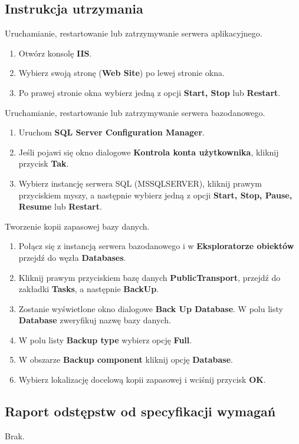 \documentclass[10pt,a4paper]{article}
\begin{document}
\subsection{Instrukcja utrzymania}
Uruchamianie, restartowanie lub zatrzymywanie serwera aplikacyjnego.
\begin{enumerate}
	\item Otwórz konsolę \textbf{IIS}.
	\item Wybierz swoją stronę (\textbf{Web Site}) po lewej stronie okna.
	\item Po prawej stronie okna wybierz jedną z opcji \textbf{Start, Stop} lub \textbf{Restart}.
\end{enumerate}
Uruchamianie, restartowanie lub zatrzymywanie serwera bazodanowego.
\begin{enumerate}
	\item Uruchom \textbf{SQL Server Configuration Manager}.
	\item Jeśli pojawi się okno dialogowe \textbf{Kontrola konta użytkownika}, kliknij przycisk \textbf{Tak}.
	\item Wybierz instancję serwera SQL (MSSQLSERVER), kliknij prawym przyciskiem myszy, a następnie wybierz jedną z opcji \textbf{Start, Stop, Pause, Resume} lub \textbf{Restart}.
\end{enumerate}
Tworzenie kopii zapasowej bazy danych.
\begin{enumerate}
	\item Połącz się z instancją serwera bazodanowego i w \textbf{Eksploratorze obiektów} przejdź do węzła \textbf{Databases}.
	\item Kliknij prawym przyciskiem bazę danych \textbf{PublicTransport}, przejdź do zakładki \textbf{Tasks}, a następnie \textbf{BackUp}.
	\item Zostanie wyświetlone okno dialogowe \textbf{Back Up Database}. W polu listy \textbf{Database} zweryfikuj nazwę bazy danych.
	\item W polu listy \textbf{Backup type} wybierz opcję \textbf{Full}.
	\item W obszarze \textbf{Backup component} kliknij opcję \textbf{Database}.
	\item Wybierz lokalizację docelową kopii zapasowej i wciśnij przycisk \textbf{OK}.
\end{enumerate}

\subsection{Raport odstępstw od specyfikacji wymagań}
Brak.
\end{document}
